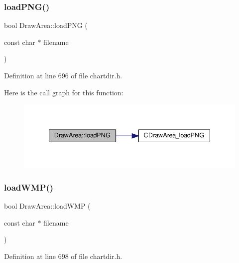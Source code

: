 \subsubsection{\texorpdfstring{load\+P\+N\+G()}{loadPNG()}}
{\footnotesize\ttfamily bool Draw\+Area\+::load\+P\+NG (\begin{DoxyParamCaption}\item[{const char $\ast$}]{filename }\end{DoxyParamCaption})\hspace{0.3cm}{\ttfamily [inline]}}



Definition at line 696 of file chartdir.\+h.

Here is the call graph for this function\+:
\nopagebreak
\begin{figure}[H]
\begin{center}
\leavevmode
\includegraphics[width=335pt]{class_draw_area_af5b2dd1d6eb5c3f973ad3fbe1c4d9a60_cgraph}
\end{center}
\end{figure}
\mbox{\label{class_draw_area_a4681d7c6e3a8f24252cecc0882da7c24}} 
\subsubsection{\texorpdfstring{load\+W\+M\+P()}{loadWMP()}}
{\footnotesize\ttfamily bool Draw\+Area\+::load\+W\+MP (\begin{DoxyParamCaption}\item[{const char $\ast$}]{filename }\end{DoxyParamCaption})\hspace{0.3cm}{\ttfamily [inline]}}



Definition at line 698 of file chartdir.\+h.

